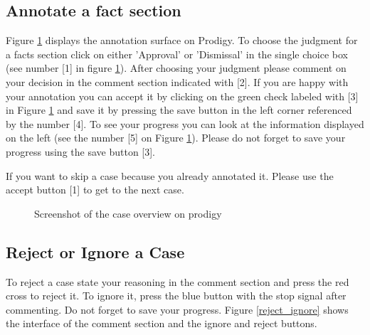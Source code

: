 \documentclass{article}
\begin{document}
\subsection{Annotate a fact section}
Figure \ref{overview} displays the annotation surface on Prodigy. To choose the judgment for a facts section click on either 'Approval' or 'Dismissal' in the single choice box (see number [1] in figure \ref{overview}). After choosing your judgment please comment on your decision in the comment section indicated with [2]. If you are happy with your annotation you can accept it by clicking on the green check labeled with [3] in Figure \ref{overview} and save it by pressing the save button in the left corner referenced by the number [4].
To see your progress you can look at the information displayed on the left (see the number [5] on Figure \ref{overview}). Please do not forget to save your progress using the save button [3].

If you want to skip a case because you already annotated it. Please use the accept button [1] to get to the next case.

\begin{figure}[h]
     \caption{Screenshot of the case overview on prodigy}
     \label{overview}
\end{figure}


\subsection{Reject or Ignore a Case}
\label{reject-ignore-case}
To reject a case state your reasoning in the comment section and press the red cross to reject it. To ignore it, press the blue button with the stop signal after commenting. Do not forget to save your progress. Figure \ref{reject_ignore} shows the interface of the comment section and the ignore and reject buttons. 
\end{document}
